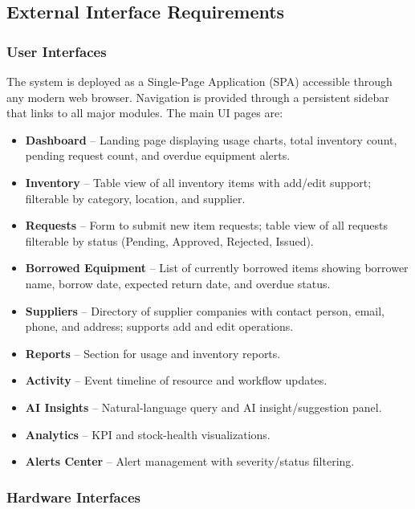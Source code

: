 \documentclass[12pt]{article}
\begin{document}
\subsection{External Interface Requirements}

\subsubsection{User Interfaces}

The system is deployed as a Single-Page Application (SPA) accessible through any modern web browser. Navigation is provided through a persistent sidebar that links to all major modules. The main UI pages are:

\begin{itemize}
\item \textbf{Dashboard} -- Landing page displaying usage charts, total inventory count, pending request count, and overdue equipment alerts.
\item \textbf{Inventory} -- Table view of all inventory items with add/edit support; filterable by category, location, and supplier.
\item \textbf{Requests} -- Form to submit new item requests; table view of all requests filterable by status (Pending, Approved, Rejected, Issued).
\item \textbf{Borrowed Equipment} -- List of currently borrowed items showing borrower name, borrow date, expected return date, and overdue status.
\item \textbf{Suppliers} -- Directory of supplier companies with contact person, email, phone, and address; supports add and edit operations.
\item \textbf{Reports} -- Section for usage and inventory reports.
\item \textbf{Activity} -- Event timeline of resource and workflow updates.
\item \textbf{AI Insights} -- Natural-language query and AI insight/suggestion panel.
\item \textbf{Analytics} -- KPI and stock-health visualizations.
\item \textbf{Alerts Center} -- Alert management with severity/status filtering.
\end{itemize}

\subsubsection{Hardware Interfaces}
\end{document}
